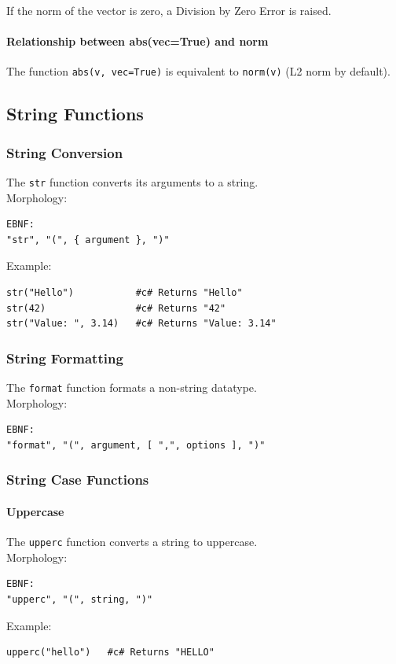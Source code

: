 \documentclass{report}
\begin{document}
If the norm of the vector is zero, a Division by Zero Error is raised.

\paragraph{Relationship between abs(vec=True) and norm}
The function \texttt{abs(v, vec=True)} is equivalent to \texttt{norm(v)} (L2 norm by default).


\subsection{String Functions}

\subsubsection{String Conversion}
The \texttt{str} function converts its arguments to a string. \\
Morphology:
\begin{verbatim}
EBNF:
"str", "(", { argument }, ")"
\end{verbatim}
Example:
\begin{verbatim}
str("Hello")           #c# Returns "Hello"
str(42)                #c# Returns "42"
str("Value: ", 3.14)   #c# Returns "Value: 3.14"
\end{verbatim}

\subsubsection{String Formatting}
The \texttt{format} function formats a non-string datatype. \\
Morphology:
\begin{verbatim}
EBNF:
"format", "(", argument, [ ",", options ], ")"
\end{verbatim}

\subsubsection{String Case Functions}
\paragraph{Uppercase}
The \texttt{upperc} function converts a string to uppercase. \\
Morphology:
\begin{verbatim}
EBNF:
"upperc", "(", string, ")"
\end{verbatim}
Example:
\begin{verbatim}
upperc("hello")   #c# Returns "HELLO"
\end{verbatim}
\end{document}
